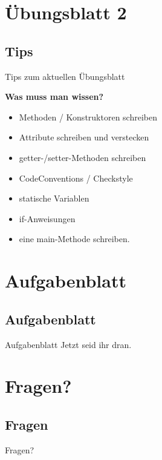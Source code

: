 \documentclass[18pt]{beamer}
\begin{document}
 
 \section{Übungsblatt 2}
 \subsection{Tips}
 \begin{frame}{Tips zum aktuellen Übungsblatt}
 
	\textbf{Was muss man wissen?}
	
	\begin{itemize}
		\item Methoden / Konstruktoren schreiben
		\item Attribute schreiben und verstecken
		\item getter-/setter-Methoden schreiben
		\item CodeConventions / Checkstyle
		\item statische Variablen
		\item if-Anweisungen
		\item eine main-Methode schreiben.
	\end{itemize}
 \end{frame}

 
\section{Aufgabenblatt}
\subsection{Aufgabenblatt}
 
\begin{frame}{Aufgabenblatt}
	Jetzt seid ihr dran.
\end{frame}

\section{Fragen?}
\subsection*{Fragen} %
\begin{frame}	
	\begin{center}
		\huge{Fragen?}
	\end{center}
\end{frame}
\end{document}
